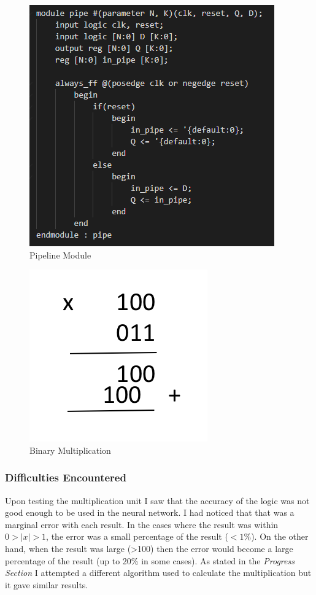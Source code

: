 \begin{figure}[H]
    \centering
    \includegraphics[scale=0.85]{resources/pipeline_module.PNG}
    \caption{Pipeline Module}
    \label{fig:pipeline_module}
\end{figure}

\begin{figure}[H]
    \centering
    \includegraphics[scale=0.85]{resources/multiplication2.PNG}
    \caption{Binary Multiplication}
    \label{fig:binary_multiplication}
\end{figure}

\subsubsection{Difficulties Encountered}
Upon testing the multiplication unit I saw that the accuracy of the logic was not good enough to be used in the neural network. I had noticed that that was a marginal error with each result. In the cases where the result was within $0>|x|>1$, the error was a small percentage of the result ($<1\%$). On the other hand, when the result was large (>100) then the error would become a large percentage of the result (up to 20\% in some cases). As stated in the \textit{Progress Section} I attempted a different algorithm used to calculate the multiplication but it gave similar results. \newline

